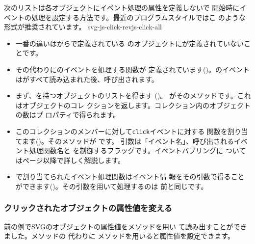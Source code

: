 次のリストは各オブジェクトにイベント処理の属性を定義しないで
開始時にイベントの処理を設定する方法です。最近のプログラムスタイルではこ
のような形式が推奨されています。
    {svg-js-click-rev}{js-click-all}
\begin{itemize}
 \item 一番の違いはからで定義されている
       のオブジェクトにが定義されていないことです。
 \item その代わりにのイベントを処理する関数が
 定義されています()。のイベントは\SVG がすべて読み込まれた後、呼び出されます。
  \item まず、を持つオブジェクトのリストを得ます
       ()。
   がそのメソッドです。これはオブジェクトのコレ
   クションを返します。コレクション内のオブジェクトの数はプ
       ロパティで得られます。
 \item このコレクションのメンバーに対して\texttt{click}イベントに対する
 関数を割り当てます()。そのメソッドが
       です。
引数は「イベント名」、呼び出されるイベント処理関数名と
を制御するフラッグです。イベントバブリングに
       ついては\pageref{eventbubling}ページ以降で詳しく解説します。
 \item {}で割り当てられたイベント処理関数はイベント情
 報をその引数で得ることができます()。その引数を用いて処理するのは
 前と同じです。
\end{itemize}

\subsubsection{クリックされたオブジェクトの属性値を変える}
前の例でSVGのオブジェクトの属性値をメソッドを用い
て読み出すことができました。メソッドの
代わりに メソッドを用いると属性値を設定できます。

